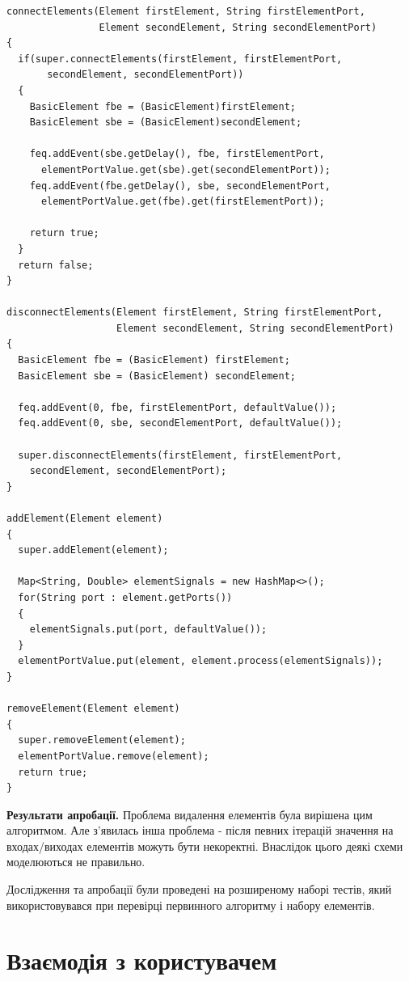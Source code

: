 \documentclass[12pt,a4paper]{article}
\begin{document}
\begin{lstlisting}
connectElements(Element firstElement, String firstElementPort,
 	            Element secondElement, String secondElementPort)
{
  if(super.connectElements(firstElement, firstElementPort,
       secondElement, secondElementPort))
  {
    BasicElement fbe = (BasicElement)firstElement;
    BasicElement sbe = (BasicElement)secondElement;

    feq.addEvent(sbe.getDelay(), fbe, firstElementPort,
      elementPortValue.get(sbe).get(secondElementPort));
    feq.addEvent(fbe.getDelay(), sbe, secondElementPort,
      elementPortValue.get(fbe).get(firstElementPort));

    return true;
  }
  return false;
}

disconnectElements(Element firstElement, String firstElementPort,
                   Element secondElement, String secondElementPort)
{
  BasicElement fbe = (BasicElement) firstElement;
  BasicElement sbe = (BasicElement) secondElement;

  feq.addEvent(0, fbe, firstElementPort, defaultValue());
  feq.addEvent(0, sbe, secondElementPort, defaultValue());

  super.disconnectElements(firstElement, firstElementPort,
    secondElement, secondElementPort);
}

addElement(Element element)
{
  super.addElement(element);

  Map<String, Double> elementSignals = new HashMap<>();
  for(String port : element.getPorts())
  {
    elementSignals.put(port, defaultValue());
  }
  elementPortValue.put(element, element.process(elementSignals));
}

removeElement(Element element)
{
  super.removeElement(element);
  elementPortValue.remove(element);
  return true;
}
\end{lstlisting}

\textbf{Результати апробації.} Проблема видалення елементів була вирішена цим алгоритмом. Але з’явилась інша проблема - після певних ітерацій значення на входах/виходах елементів можуть бути некоректні. Внаслідок цього деякі схеми моделюються не правильно.

Дослідження та апробації були проведені на розширеному наборі тестів, який використовувався при перевірці первинного алгоритму і набору елементів.

\clearpage

\section{Взаємодія з користувачем}
\end{document}
